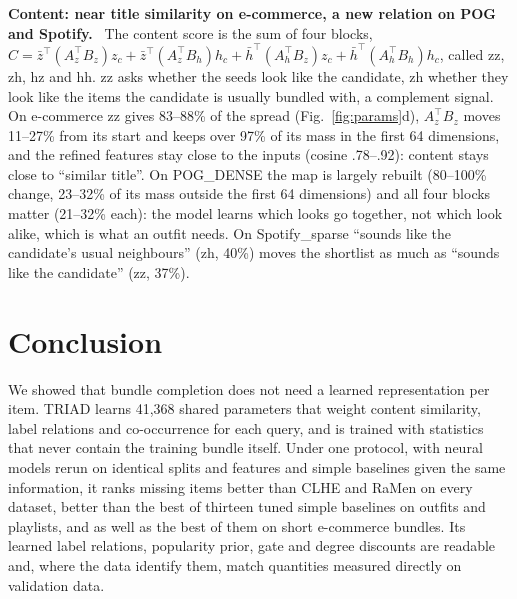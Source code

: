 \documentclass[runningheads]{llncs}
\renewcommand{\paragraph}[1]{\smallskip\noindent\textbf{#1}\ }
\begin{document}
\paragraph{Content: near title similarity on e-commerce, a new relation on POG and Spotify.} The content score is the
sum of four blocks, $C=\bar z^{\top}(A_z^{\top}B_z)z_c+\bar z^{\top}(A_z^{\top}B_h)h_c+\bar h^{\top}(A_h^{\top}B_z)z_c
+\bar h^{\top}(A_h^{\top}B_h)h_c$, called zz, zh, hz and hh. zz asks whether the seeds look like the candidate, zh
whether they look like the items the candidate is usually bundled with, a complement signal. On e-commerce zz gives
83--88\% of the spread (Fig.~\ref{fig:params}d), $A_z^{\top}B_z$ moves 11--27\% from its start and keeps over 97\% of
its mass in the first 64 dimensions, and the refined features stay close to the inputs (cosine .78--.92): content
stays close to ``similar title''. On POG\_DENSE the map is largely rebuilt (80--100\% change, 23--32\% of its mass
outside the first 64 dimensions) and all four blocks matter (21--32\% each): the model learns which looks go together,
not which look alike, which is what an outfit needs. On Spotify\_sparse ``sounds like the candidate's usual
neighbours'' (zh, 40\%) moves the shortlist as much as ``sounds like the candidate'' (zz, 37\%).

\section{Conclusion}

We showed that bundle completion does not need a learned representation per item. TRIAD learns 41,368 shared
parameters that weight content similarity, label relations and co-occurrence for each query, and is trained with
statistics that never contain the training bundle itself. Under one protocol, with neural models rerun on identical
splits and features and simple baselines given the same information, it ranks missing items better than CLHE and
RaMen on every dataset, better than the best of thirteen tuned simple baselines on outfits and playlists, and as well
as the best of them on short e-commerce bundles. Its learned label relations, popularity prior, gate and degree
discounts are readable and, where the data identify them, match quantities measured directly on validation data.
\end{document}
